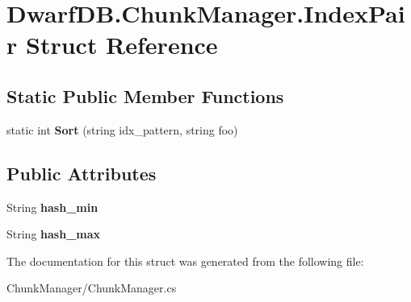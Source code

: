 \hypertarget{struct_dwarf_d_b_1_1_chunk_manager_1_1_index_pair}{\section{Dwarf\+D\+B.\+Chunk\+Manager.\+Index\+Pair Struct Reference}
\label{struct_dwarf_d_b_1_1_chunk_manager_1_1_index_pair}
}
\subsection*{Static Public Member Functions}
\begin{DoxyCompactItemize}
\item 
\hypertarget{struct_dwarf_d_b_1_1_chunk_manager_1_1_index_pair_a66823af2deacc422dcac11403249dc52}{static int {\bfseries Sort} (string idx\+\_\+pattern, string foo)}\label{struct_dwarf_d_b_1_1_chunk_manager_1_1_index_pair_a66823af2deacc422dcac11403249dc52}

\end{DoxyCompactItemize}
\subsection*{Public Attributes}
\begin{DoxyCompactItemize}
\item 
\hypertarget{struct_dwarf_d_b_1_1_chunk_manager_1_1_index_pair_a703b8eeb5f0a8d55006a8df195130df7}{String {\bfseries hash\+\_\+min}}\label{struct_dwarf_d_b_1_1_chunk_manager_1_1_index_pair_a703b8eeb5f0a8d55006a8df195130df7}

\item 
\hypertarget{struct_dwarf_d_b_1_1_chunk_manager_1_1_index_pair_a0c8153c980b5a092260aa85d23e1b912}{String {\bfseries hash\+\_\+max}}\label{struct_dwarf_d_b_1_1_chunk_manager_1_1_index_pair_a0c8153c980b5a092260aa85d23e1b912}

\end{DoxyCompactItemize}


The documentation for this struct was generated from the following file\+:\begin{DoxyCompactItemize}
\item 
Chunk\+Manager/Chunk\+Manager.\+cs\end{DoxyCompactItemize}
